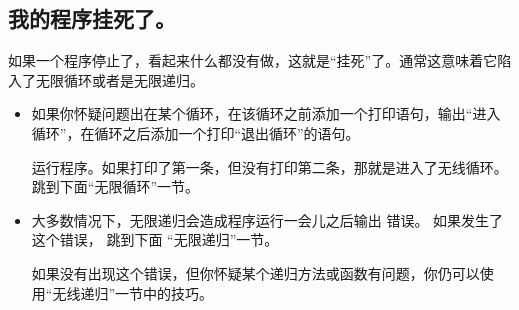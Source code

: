 \subsection{我的程序挂死了。}



如果一个程序停止了，看起来什么都没有做，这就是“挂死”了。通常这意味着它陷入了无限循环或者是无限递归。

\begin{itemize}


\item 如果你怀疑问题出在某个循环，在该循环之前添加一个打印语句，输出“进入循环”，在循环之后添加一个打印“退出循环”的语句。


   运行程序。如果打印了第一条，但没有打印第二条，那就是进入了无线循环。跳到下面“无限循环”一节。


\item 大多数情况下，无限递归会造成程序运行一会儿之后输出
 错误。
如果发生了这个错误， 跳到下面 ``无限递归''一节。


如果没有出现这个错误，但你怀疑某个递归方法或函数有问题，你仍可以使用“无线递归”一节中的技巧。



\end{itemize}
